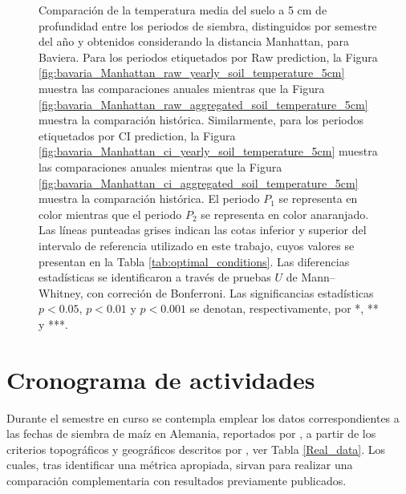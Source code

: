 \begin{figure}[htbp]
	\caption{
		Comparación de la temperatura media del suelo a 5 cm de profundidad entre los periodos de siembra, distinguidos por semestre del año y obtenidos considerando la distancia Manhattan, para Baviera. Para los periodos etiquetados por Raw prediction, la Figura \ref{fig:bavaria_Manhattan_raw_yearly_soil_temperature_5cm} muestra las comparaciones anuales mientras que la Figura \ref{fig:bavaria_Manhattan_raw_aggregated_soil_temperature_5cm} muestra la comparación histórica. Similarmente, para los periodos etiquetados por CI prediction, la Figura \ref{fig:bavaria_Manhattan_ci_yearly_soil_temperature_5cm} muestra las comparaciones anuales mientras que la Figura \ref{fig:bavaria_Manhattan_ci_aggregated_soil_temperature_5cm} muestra la comparación histórica. El periodo $P_1$ se representa en color mientras que el periodo $P_2$ se representa en color anaranjado. Las líneas punteadas grises indican las cotas inferior y superior del intervalo de referencia utilizado en este trabajo, cuyos valores se presentan en la Tabla \ref{tab:optimal_conditions}. Las diferencias estadísticas se identificaron a través de pruebas $U$ de Mann--Whitney, con correción de Bonferroni. Las significancias estadísticas $p<0.05$, $p<0.01$ y $p<0.001$ se denotan, respectivamente, por *, ** y ***.
	}
	\label{fig:bavaria_Manhattan_soil_temperature_5cm}
	
	
\end{figure}



\newpage
\newpage
\clearpage
\section{Cronograma de actividades}



Durante el semestre en curso se contempla emplear los datos correspondientes a las fechas de siembra de maíz en Alemania, reportados por \citet[Tabla 1]{Parker_2016}, a partir de los criterios topográficos y geográficos descritos por \cite{Flores_2025}, ver Tabla \ref{Real_data}. Los cuales, tras identificar una métrica apropiada, sirvan para realizar una comparación complementaria con resultados previamente publicados.\\

